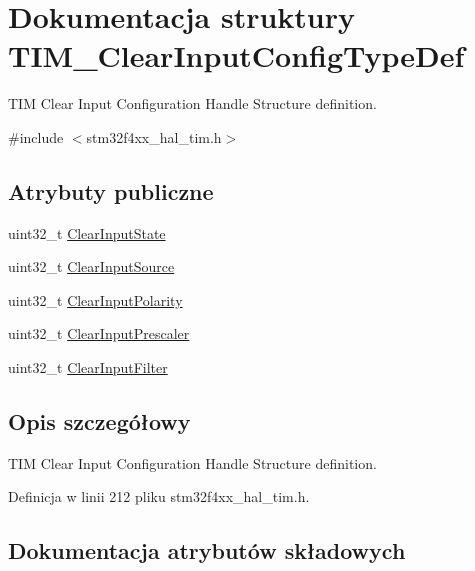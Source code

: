 \hypertarget{struct_t_i_m___clear_input_config_type_def}{}\section{Dokumentacja struktury T\+I\+M\+\_\+\+Clear\+Input\+Config\+Type\+Def}
\label{struct_t_i_m___clear_input_config_type_def}


T\+IM Clear Input Configuration Handle Structure definition.  




{\ttfamily \#include $<$stm32f4xx\+\_\+hal\+\_\+tim.\+h$>$}

\subsection*{Atrybuty publiczne}
\begin{DoxyCompactItemize}
\item 
uint32\+\_\+t \hyperlink{struct_t_i_m___clear_input_config_type_def_a01d4b91dd297c4f0582a4d9179abf32f}{Clear\+Input\+State}
\item 
uint32\+\_\+t \hyperlink{struct_t_i_m___clear_input_config_type_def_a776d2f14021a82e022468fd46594b8a0}{Clear\+Input\+Source}
\item 
uint32\+\_\+t \hyperlink{struct_t_i_m___clear_input_config_type_def_a49dbc65edc5316822fcabd61cc8409de}{Clear\+Input\+Polarity}
\item 
uint32\+\_\+t \hyperlink{struct_t_i_m___clear_input_config_type_def_a509cecb64fec71391ddc8b4703e09cfe}{Clear\+Input\+Prescaler}
\item 
uint32\+\_\+t \hyperlink{struct_t_i_m___clear_input_config_type_def_a6d2e06a970e30aaf4f8a6091e443eecf}{Clear\+Input\+Filter}
\end{DoxyCompactItemize}


\subsection{Opis szczegółowy}
T\+IM Clear Input Configuration Handle Structure definition. 

Definicja w linii 212 pliku stm32f4xx\+\_\+hal\+\_\+tim.\+h.



\subsection{Dokumentacja atrybutów składowych}
\mbox{\label{struct_t_i_m___clear_input_config_type_def_a6d2e06a970e30aaf4f8a6091e443eecf}} 
